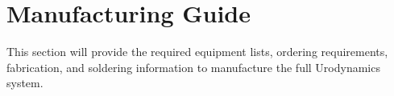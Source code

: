 \section{Manufacturing Guide}
This section will provide the required equipment lists, ordering requirements, fabrication, and soldering information to manufacture the full Urodynamics system. 






